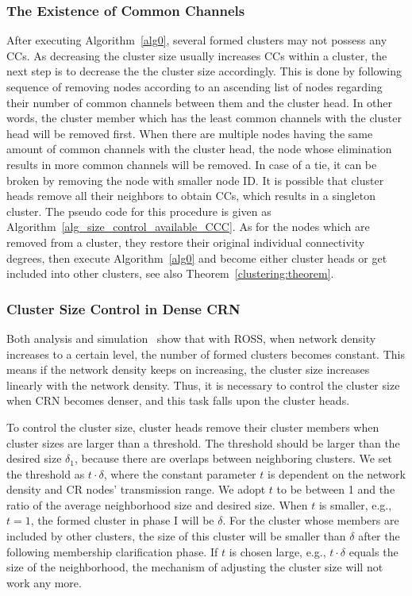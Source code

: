 \documentclass[times]{ettauth}
\newcommand{\eg}{e.g., }
\theoremstyle{mytheoremstyle}
\theoremstyle{mytheoremstyle}
\theoremstyle{mytheoremstyle}
\begin{document}
\subsubsection{The Existence of Common Channels}
\label{ross_p1_guarantee_ccc}
After executing Algorithm~\ref{alg0}, several formed clusters may not possess any CCs.
As decreasing the cluster size usually increases CCs within a cluster, the next step is to decrease the the cluster size accordingly.
This is done by following sequence of removing nodes according to an ascending list of nodes regarding their number of common channels between them and the cluster head. 
In other words, the cluster member which has the least common channels with the cluster head will be removed first.
When there are multiple nodes having the same amount of common channels with the cluster head, the node whose elimination results in more common channels will be removed.
In case of a tie, it can be broken by removing the node with smaller node ID.
It is possible that cluster heads remove all their neighbors to obtain CCs, which results in a singleton cluster.
The pseudo code for this procedure is given as Algorithm~\ref{alg_size_control_available_CCC}.
As for the nodes which are removed from a cluster, they restore their original individual connectivity degrees, then execute Algorithm~\ref{alg0} and become either cluster heads or get included into other clusters, see also Theorem~\ref{clustering:theorem}.


\subsubsection{Cluster Size Control in Dense CRN}
\label{ross_p2_cluster_pruning}

Both analysis and simulation~\cite{2017arXiv170404828L} show that with ROSS, when network density increases to a certain level, the number of formed clusters becomes constant.
This means if the network density keeps on increasing, the cluster size increases linearly with the network density.
Thus, it is necessary to control the cluster size when CRN becomes denser, and this task falls upon the cluster heads.

To control the cluster size, cluster heads remove their cluster members when cluster sizes are larger than a threshold.
The threshold should be larger than the desired size $\delta_1$, because there are overlaps between neighboring clusters.
We set the threshold as $t\cdot \delta$, where the constant parameter $t$ is dependent on the network density and CR nodes' transmission range.
We adopt $t$ to be between 1 and the ratio of the average neighborhood size and desired size.
When $t$ is smaller, \eg $t=1$, the formed cluster in phase I will be $\delta$.
For the cluster whose members are included by other clusters, the size of this cluster will be smaller than $\delta$ after the following membership clarification phase.
If $t$ is chosen large, \eg $t\cdot\delta$ equals the size of the neighborhood, the mechanism of adjusting the cluster size will not work any more.
	
\end{document}
